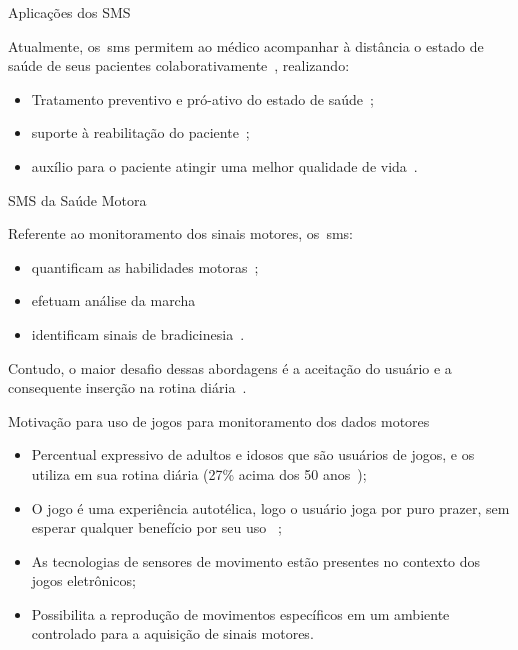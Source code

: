 \documentclass{beamer}
\begin{document}
\begin{frame}{Aplicações dos SMS}  
  \begin{block}{}
  Atualmente, os~\ac{sms} permitem ao médico acompanhar à distância o estado de saúde de seus pacientes colaborativamente~\cite{healthmonitoring2013}, realizando:  
  \begin{itemize}
   \item Tratamento preventivo e pró-ativo do estado de saúde~\cite{bardram2010}; 
   \item suporte à reabilitação do paciente~\cite{sacbespoke2014};
   \item auxílio para o paciente atingir uma melhor qualidade de vida~\cite{sacsvmhms2014}. 
  \end{itemize} 
  \end{block} 
\end{frame}


\begin{frame}{SMS da Saúde Motora}  
  \begin{block}{}
  
  Referente ao monitoramento dos sinais motores, os~\ac{sms}:  
  \begin{itemize}
   \item quantificam as habilidades motoras~\cite{manumeterjbhi2014,patel_monitoring_2009};
   \item efetuam análise da marcha \cite{robotgait2014}
   \item identificam sinais de bradicinesia~\cite{ambulatoryparkinson2010}. 
  \end{itemize}   
  \end{block} 
  
  \begin{alertblock}{}
   Contudo, o maior desafio dessas abordagens é a aceitação do usuário e a consequente inserção na rotina diária~\cite{alemdar2015}.
  \end{alertblock}
 
\end{frame}





\begin{frame}{Motivação para uso de jogos para monitoramento dos dados motores}
	\begin{block}{}
	\begin{itemize}[<+->]
	    \item Percentual expressivo de adultos e idosos que são usuários de jogos, e os utiliza em sua rotina diária (27\% acima dos 50 anos~\cite{esa2015});
	    \item O jogo é uma experiência autotélica, logo o usuário joga por puro prazer, sem esperar qualquer benefício por seu uso ~\cite{sweetser2005-gameflow};
	    \item As tecnologias de sensores de movimento estão presentes no contexto dos jogos eletrônicos;
	    \item Possibilita a reprodução de movimentos específicos em um ambiente controlado para a aquisição de sinais motores.
	\end{itemize}
	\end{block}
\end{frame}
\end{document}
